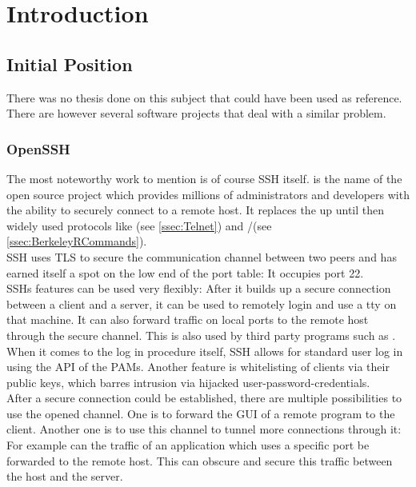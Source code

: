 \documentclass[10pt,a4paper,titlepage,twoside,english,final]{zhawreprt}
\begin{document}
\makedeclarationoforiginality

\tableofcontents

\chapter{Introduction}\label{chp:Introduction}
\section{Initial Position}\label{sec:InitialPosition}
There was no thesis done on this subject that could have been used as reference. There are however several software projects that deal with a similar problem.

\subsection{OpenSSH}\label{ssec:OpenSSH}
The most noteworthy work to mention is of course \gls{SSH} itself. \cite{openssh} is the name of the open source project which provides millions of administrators and developers with the ability to securely connect to a remote host. It replaces the up until then widely used protocols like \cite{telnet}(see \ref{ssec:Telnet}) and \cite{rlogin}/\cite{rsh}(see \ref{ssec:BerkeleyRCommands}).\\
\gls{SSH} uses \gls{TLS} to secure the communication channel between two peers and has earned itself a spot on the low end of the \gls{port} table: It occupies \gls{port} 22.\\
\gls{SSH}s features can be used very flexibly: After it builds up a secure connection between a client and a server, it can be used to remotely login and use a \gls{tty} on that machine.
It can also forward traffic on local ports to the remote host through the secure channel. This is also used by third party programs such as \cite{rsync}.\\
When it comes to the log in procedure itself, \gls{SSH} allows for standard user log in using the \gls{API} of the \glspl{PAM}. Another feature is whitelisting of clients via their public keys, which barres intrusion via hijacked user-password-credentials.\\
After a secure connection could be established, there are multiple possibilities to use the opened channel. One is to forward the \gls{GUI} of a remote program to the client. Another one is to use this channel to tunnel more connections through it: For example can the traffic of an application which uses a specific \gls{port} be forwarded to the remote host. This can obscure and secure this traffic between the host and the server.
\end{document}
